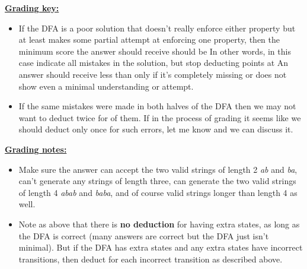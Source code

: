 \documentclass[11pt,fleqn]{article}
\begin{document}
\begin{enumerate}
\begin{info}{\textbf{\underline{Grading key:}}}
\begin{itemize}
              \item If the DFA is a poor solution that doesn't really
                    enforce either property but at least makes some partial
                    attempt at enforcing one property, then the minimum
                    score the answer should receive should be   In
                    other words, in this case indicate all mistakes in the
                    solution, but stop deducting points at  An
                    answer should receive less than  only if it's
                    completely missing or does not show even a minimal
                    understanding or attempt.

              \item If the same mistakes were made in both halves of the DFA
                    then we may not want to deduct twice for of them.  If in
                    the process of grading it seems like we should deduct
                    only once for such errors, let me know and we can
                    discuss it.

            \end{itemize}

          \end{info}

          \enlargethispage{4mm}

          \begin{info}{\textbf{\underline{Grading notes:}}}

            \begin{itemize}

              \addtolength{\itemsep}{1mm}

              \item Make sure the answer can accept the two valid strings of
                    length 2 \emph{ab} and \emph{ba}, can't generate any
                    strings of length three, can generate the two valid
                    strings of length 4 \emph{abab} and \emph{baba}, and of
                    course valid strings longer than length 4 as well.

              \item Note as above that there is \textbf{no deduction} for
                    having extra states, as long as the DFA is correct (many
                    answers are correct but the DFA just isn't minimal).
                    But if the DFA has extra states and any extra states
                    have incorrect transitions, then deduct  for each
                    incorrect transition as described above.


\end{itemize}
\end{info}
\end{enumerate}
\end{document}
